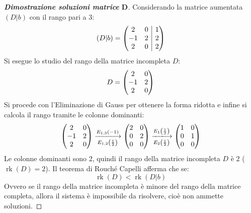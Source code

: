 \documentclass[a4paper]{article}
\makeatletter
\DeclareMathOperator{\rk}{rk}
\newenvironment{rowequmat}[1]{\left(\array{@{}#1@{}}}{\endarray\right)}
\makeatother
\begin{document}
	\begin{proof}[\textbf{Dimostrazione soluzioni matrice} $\boldsymbol{D}$]
		Considerando la matrice aumentata $\left(D|b\right)$ con il rango pari a $3$:
		\begin{equation*}
			\left(D|b\right) = \begin{rowequmat}{cc|c}
				2 & 0 & 1 \\
				-1 & 2 & 2 \\
				2 & 0 & 2
			\end{rowequmat}
		\end{equation*}
		Si esegue lo studio del rango della matrice incompleta $D$:
		\begin{equation*}
			D = \begin{rowequmat}{cc}
				2 & 0 \\
				-1 & 2 \\
				2 & 0
			\end{rowequmat}
		\end{equation*}
		Si procede con l'Eliminazione di Gauss per ottenere la forma ridotta e infine si calcola il rango tramite le colonne dominanti:
		\begin{gather*}
			\begin{rowequmat}{cc}
				2 & 0 \\
				-1 & 2 \\
				2 & 0
			\end{rowequmat} \xlongrightarrow[E_{1,2}\left(\frac{1}{2}\right)]{E_{1,3}\left(-1\right)}
			\begin{rowequmat}{cc}
				2 & 0 \\
				0 & 2 \\
				0 & 0
			\end{rowequmat} \xlongrightarrow[E_{2}\left(\frac{1}{2}\right)]{E_{1}\left(\frac{1}{2}\right)}
			\begin{rowequmat}{cc}
				1 & 0 \\
				0 & 1 \\
				0 & 0
			\end{rowequmat}
		\end{gather*}
		Le colonne dominanti sono $2$, quindi il rango della matrice incompleta $D$ è $2$ ($\rk\left(D\right) = 2$). Il teorema di Rouché Capelli afferma che se:
		\begin{equation*}
			\rk\left(D\right) < \rk\left(D|b\right)
		\end{equation*}
		Ovvero se il rango della matrice incompleta è minore del rango della matrice completa, allora il sistema è impossibile da risolvere, cioè non ammette soluzioni.
	\end{proof}\newpage
\end{document}
